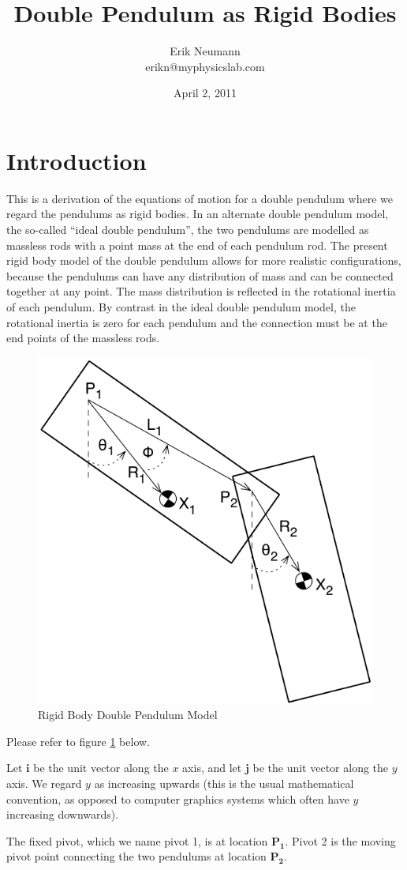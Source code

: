\documentclass[draft]{article}
\title{Double Pendulum as Rigid Bodies}
\author{Erik Neumann\\
erikn@myphysicslab.com}
\date{April 2, 2011}
\begin{document}
\maketitle
\section{Introduction}

This is a derivation of the equations of motion for a double pendulum where we regard the pendulums as rigid bodies.  In an alternate double pendulum model, the so-called ``ideal double pendulum'', the two pendulums are modelled as massless rods with a point mass at the end of each pendulum rod.  The present rigid body model of the double pendulum allows for more realistic configurations, because the pendulums can have any distribution of mass and can be connected together at any point.  The mass distribution is reflected in the rotational inertia of each pendulum.  By contrast in the ideal double pendulum model, the rotational inertia is zero for each pendulum and the connection must be at the end points of the massless rods.

\begin{figure}
    \centering
    \includegraphics[width=0.40 \textwidth]{Rigid_Double_Pendulum_fig_1.pdf}
    \caption{Rigid Body Double Pendulum Model} \label{fig_1}
\end{figure}

Please refer to figure \ref{fig_1} below.

Let $\mathbf{i}$ be the unit vector along the $x$ axis, and let $\mathbf{j}$ be the unit vector along the $y$ axis.  We regard $y$ as increasing upwards (this is the usual mathematical convention, as opposed to computer graphics systems which often have $y$ increasing downwards).  

The fixed pivot, which we name pivot 1, is at location $\mathbf{P_1}$.  Pivot 2 is the moving pivot point connecting the two pendulums at location $\mathbf{P_2}$.
\end{document}

